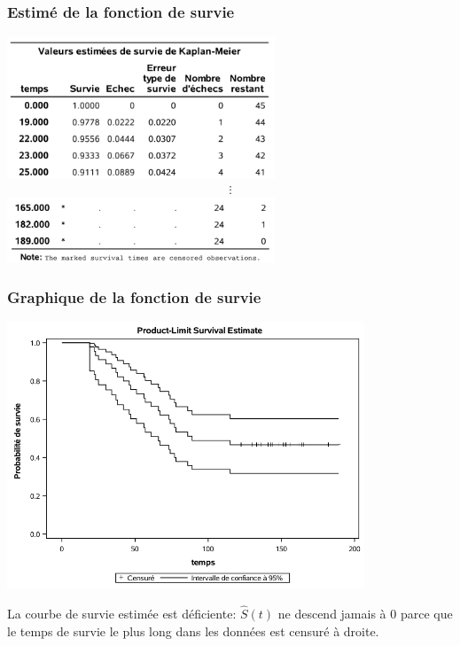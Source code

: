 \documentclass{beamer}
\begin{document}
\begin{frame}
\frametitle{Estimé de la fonction de survie}
\begin{center}
\includegraphics[width = 0.6\textwidth]{img/c7/diapos7e03}
\begin{align*}
 \vdots
\end{align*}
\includegraphics[width = 0.6\textwidth]{img/c7/diapos7e04}
\end{center}
\end{frame}

\begin{frame}
\frametitle{Graphique de la fonction de survie}
\begin{center}
\includegraphics[width = 0.8\textwidth]{img/c7/diapos7e05}
\end{center}
{ \footnotesize 

La courbe de survie estimée est déficiente: $\widehat{S}(t)$ ne descend jamais à $0$ parce que le temps de survie le plus long dans les données est censuré à droite.


}
\end{frame}
% 
% 
\end{document}
